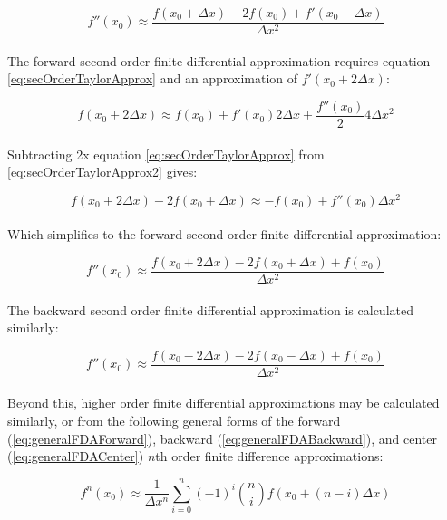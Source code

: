 {   \begin{equation}\label{eq:fdaseccentered}
   f''(x_{0}) \approx \frac{f(x_{0} + \Delta  x) - 2f(x_{0}) + f'(x_{0} -\Delta  x)}{\Delta  x^{2}}
  \end{equation}
    \\
  The forward second order finite differential approximation requires equation \ref{eq:secOrderTaylorApprox} and an approximation of $f'(x_{0} + 2\Delta  x)$:
  
  \begin{equation}\label{eq:secOrderTaylorApprox2}
  f(x_{0} + 2\Delta  x) \approx f(x_{0}) + f'(x_{0})2\Delta  x + \frac{f''(x_{0})}{2}4\Delta  x^{2}
  \end{equation}
    \\
  Subtracting 2x equation \ref{eq:secOrderTaylorApprox} from \ref{eq:secOrderTaylorApprox2} gives:
  
    \begin{equation}
  f(x_{0} + 2\Delta  x) - 2f(x_{0} + \Delta  x) \approx -f(x_{0}) + f''(x_{0})\Delta  x^{2}
  \end{equation}
  \\
Which simplifies to the forward second order finite differential approximation:
  
      \begin{equation}\label{eq:fdasecforward}
f''(x_{0}) \approx \frac{f(x_{0} + 2\Delta  x) - 2f(x_{0} + \Delta  x) + f(x_{0})}{\Delta  x^{2}}
  \end{equation}
  \\
  The backward second order finite differential approximation is calculated similarly:
  
        \begin{equation}\label{eq:fdasecbackward}
f''(x_{0}) \approx \frac{f(x_{0} - 2\Delta  x) - 2f(x_{0} - \Delta  x) + f(x_{0})}{\Delta  x^{2}}
  \end{equation}
  \\
 Beyond this, higher order finite differential approximations may be calculated similarly, or from the following general forms of the forward (\ref{eq:generalFDAForward}), backward (\ref{eq:generalFDABackward}), and center (\ref{eq:generalFDACenter}) $n$th order finite difference approximations:
 
  \begin{equation}\label{eq:generalFDAForward}
 f^{n}(x_{0}) \approx \frac{1}{\Delta  x^{n}}\sum_{i=0}^{n}(-1)^{i}\binom {n} {i}f(x_{0} + (n-i)\Delta  x)
 \end{equation}
 
}
